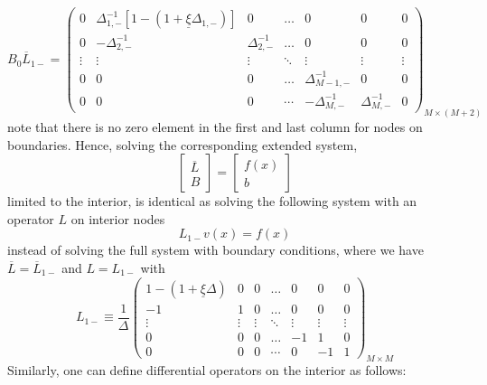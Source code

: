 \documentclass[11pt]{article}
\theoremstyle{definition}
\begin{document}
\begin{equation}
B_0 \overline{L}_{1-} = \begin{pmatrix}
0&\Delta_{1,-}^{-1} \left[ 1 - (1+\underline{\xi} \Delta_{1,-} )\right] &0&\dots&0&0&0\\
0&-\Delta_{2,-}^{-1}&\Delta_{2,-}^{-1}&\dots&0&0&0\\
\vdots&\vdots&\vdots&\ddots&\vdots&\vdots&\vdots\\
0&0&0&\dots&\Delta_{M-1,-}^{-1}&0&0\\
0&0&0&\cdots&-\Delta_{M,-}^{-1}&\Delta_{M,-}^{-1}&0
\end{pmatrix}_{M\times (M+2)}
\end{equation}
note that there is no zero element in the first and last column for nodes on boundaries. Hence, solving the corresponding extended system, 
\begin{equation}
\begin{bmatrix}
\overline{L}\\
B
\end{bmatrix} = 
\begin{bmatrix}
f(x) \\ b
\end{bmatrix}
\end{equation}
limited to the interior, is identical as solving the following system with an operator $L$ on interior nodes
\begin{equation}
L_{1-} v(x) = f(x)
\end{equation}
instead of solving the full system with boundary conditions, where we have $\overline{L} = \overline{L}_{1-}$ and $L = L_{1-}$ with
\begin{equation}
L_{1-} \equiv \frac{1}{\Delta}\begin{pmatrix}
1 - (1 + \underline{\xi} \Delta) &0&0&\dots&0&0&0\\
-1&1&0&\dots&0&0&0\\
\vdots&\vdots&\vdots&\ddots&\vdots&\vdots&\vdots\\
0&0&0&\dots&-1&1&0\\
0&0&0&\cdots&0&-1&1
\end{pmatrix}_{M\times M}
\end{equation}
Similarly, one can define differential operators on the interior as follows:
\end{document}
